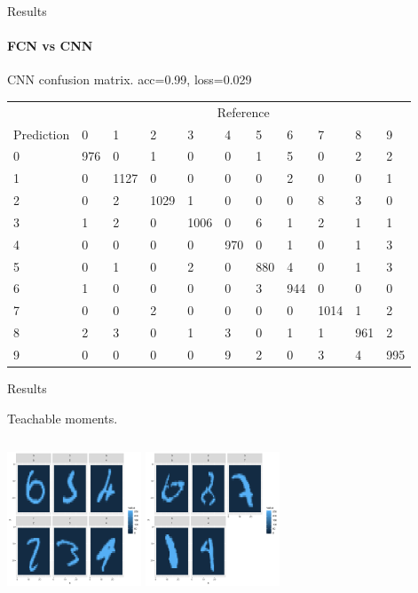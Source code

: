 \documentclass{beamer}
\begin{document}
\begin{darkframes}
    \begin{frame}{Results}
      \framesubtitle{FCN vs CNN}
      \begin{block}
      {\small{CNN confusion matrix. acc=0.99, loss=0.029}}
      \end{block}
        \tiny{\begin{table}[]
            \begin{tabular}{lllllllllll}
             & \multicolumn{10}{c}{Reference} \\
            Prediction & 0 & 1 & 2 & 3 & 4 & 5 & 6 & 7 & 8 & 9 \\
            0 & 976 & 0 & 1 & 0 & 0 & 1 & 5 & 0 & 2 & 2 \\
            1 & 0 & 1127 & 0 & 0 & 0 & 0 & 2 & 0 & 0 & 1 \\
            2 & 0 & 2 & 1029 & 1 & 0 & 0 & 0 & 8 & 3 & 0 \\
            3 & 1 & 2 & 0 & 1006 & 0 & 6 & 1 & 2 & 1 & 1 \\
            4 & 0 & 0 & 0 & 0 & 970 & 0 & 1 & 0 & 1 & 3 \\
            5 & 0 & 1 & 0 & 2 & 0 & 880 & 4 & 0 & 1 & 3 \\
            6 & 1 & 0 & 0 & 0 & 0 & 3 & 944 & 0 & 0 & 0 \\
            7 & 0 & 0 & 2 & 0 & 0 & 0 & 0 & 1014 & 1 & 2 \\
            8 & 2 & 3 & 0 & 1 & 3 & 0 & 1 & 1 & 961 & 2 \\
            9 & 0 & 0 & 0 & 0 & 9 & 2 & 0 & 3 & 4 & 995
            \end{tabular}
            \end{table}}
    \end{frame}
    
    \begin{frame}{Results}
      \begin{block}{Teachable moments.}
      \end{block}
      \begin{columns}[onlytextwidth]
            \includegraphics[width=4cm, height=4cm]{bad_pred.pdf}
            \includegraphics[width=4cm, height=4cm]{bad_pred2.pdf}
    \end{columns}
    \end{frame}


\end{darkframes}
\end{document}
